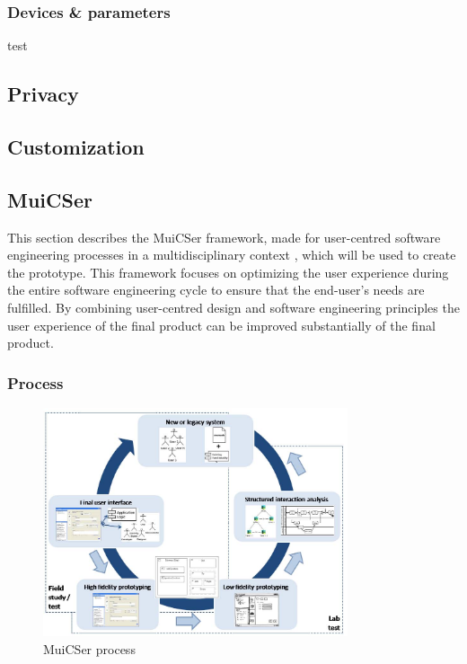         \subsubsection{Devices \& parameters}

        test


    \subsection{Privacy}

    \subsection{Customization}

    \subsection{MuiCSer} \label{2_muicser}
    This section describes the MuiCSer framework, made for user-centred software engineering processes in a multidisciplinary context \cite{muicser}, which will be used to create the prototype. This framework focuses on optimizing the user experience during the entire software engineering cycle to ensure that the end-user's needs are fulfilled. By combining user-centred design and software engineering principles the user experience of the final product can be improved substantially of the final product.

        \subsubsection{Process}
        
        \begin{figure}[!t]
            \centering
            \includegraphics[width=0.8\textwidth]{chapters/2_background/muicser}
            \caption{MuiCSer process}\label{fig:muicser}
        \end{figure}

